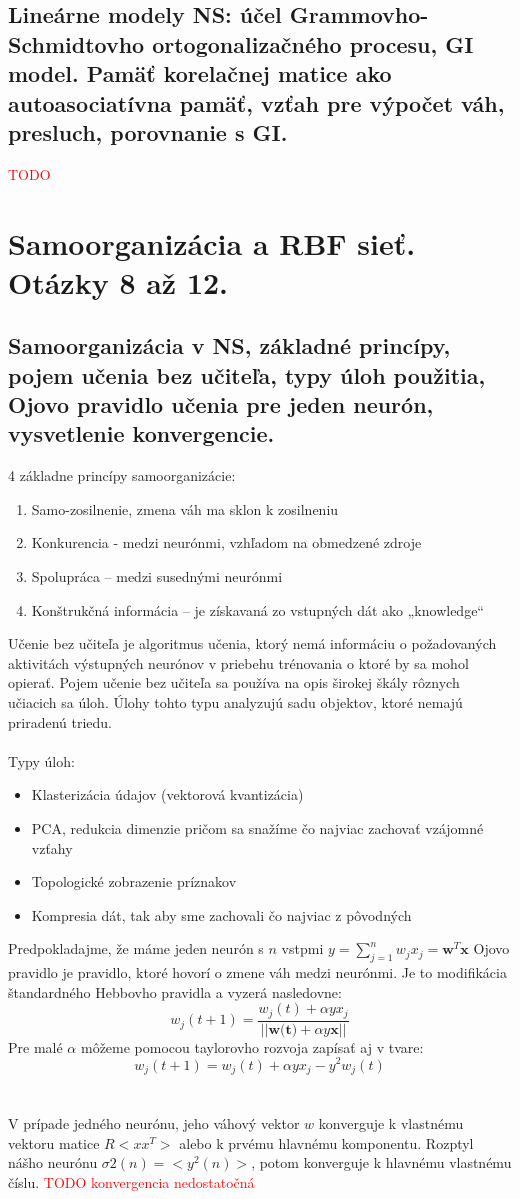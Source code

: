 \documentclass{article}
\numberwithin{equation}{section} %
\begin{document}
\subsection{Lineárne modely NS: účel Grammovho-Schmidtovho ortogonalizačného procesu, GI model. Pamäť korelačnej matice ako autoasociatívna pamäť, vzťah pre výpočet váh, presluch, porovnanie s GI.}
\textcolor{red}{TODO}


\section{Samoorganizácia a RBF sieť. Otázky 8 až 12.}
\subsection{Samoorganizácia v NS, základné princípy, pojem učenia bez učiteľa, typy úloh použitia, Ojovo pravidlo učenia pre jeden neurón, vysvetlenie konvergencie.}

4 základne princípy samoorganizácie:
\begin{enumerate}
\item Samo-zosilnenie,  zmena váh ma sklon k zosilneniu
\item Konkurencia - medzi neurónmi, vzhľadom na obmedzené zdroje
\item Spolupráca – medzi susednými neurónmi
\item Konštrukčná informácia – je získavaná zo vstupných dát ako „knowledge“
\end{enumerate}
Učenie bez učiteľa je algoritmus učenia, ktorý nemá informáciu o požadovaných aktivitách výstupných neurónov v priebehu trénovania o ktoré by sa mohol opierať. Pojem učenie bez učiteľa sa používa na opis širokej škály rôznych učiacich sa úloh. Úlohy tohto typu analyzujú sadu objektov, ktoré nemajú priradenú triedu.
\\\\
Typy úloh:
\begin{itemize}
\item Klasterizácia údajov (vektorová kvantizácia)
\item PCA, redukcia dimenzie pričom sa snažíme čo najviac zachovať vzájomné vzťahy
\item Topologické zobrazenie príznakov
\item Kompresia dát, tak aby sme zachovali čo najviac z pôvodných
\end{itemize}
Predpokladajme, že máme jeden neurón s $n$ vstpmi $y = \sum_{j=1}^n w_jx_j = \textbf{w}^T\textbf{x}$
Ojovo pravidlo je pravidlo, ktoré hovorí o zmene váh medzi neurónmi. Je to modifikácia štandardného Hebbovho pravidla a vyzerá nasledovne:
$$w_j(t+1) = \frac{w_j(t) + \alpha yx_j}{||\textbf{w(t)} + \alpha y\textbf{x}||}$$
Pre malé $\alpha$ môžeme pomocou taylorovho rozvoja zapísať aj v tvare:
$$w_j(t+1)= w_j(t)+\alpha yx_j - y^2w_j(t)$$
\\\\
V prípade jedného neurónu, jeho váhový vektor $w$ konverguje k vlastnému vektoru matice $R<xx^T>$ alebo k prvému hlavnému komponentu. Rozptyl nášho neurónu $\sigma2(n) = <y^2(n)>$, potom konverguje k hlavnému vlastnému číslu.
\textcolor{red}{TODO konvergencia nedostatočná}
\end{document}
